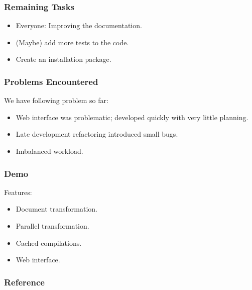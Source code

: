 \documentclass{beamer}
\begin{document}
\begin{frame}
  \frametitle{Remaining Tasks}
  \begin{itemize}
    \item Everyone: Improving the documentation. 
    \item (Maybe) add more tests to the code.
    \item Create an installation package.
  \end{itemize}
\end{frame}

\begin{frame}
  \frametitle{Problems Encountered}
  We have following problem so far:
  \begin{itemize}
    \item Web interface was problematic; developed quickly with very little planning.
    \item Late development refactoring introduced small bugs.
    \item Imbalanced workload.
  \end{itemize}
\end{frame}


\begin{frame}
  \frametitle{Demo}
  Features:
  \begin{itemize}
    \item Document transformation.
    \item Parallel transformation.
    \item Cached compilations.
    \item Web interface.
  \end{itemize} 
\end{frame}

\begin{frame}
  \frametitle{Reference}
    \printbibliography
\end{frame}
\end{document}
